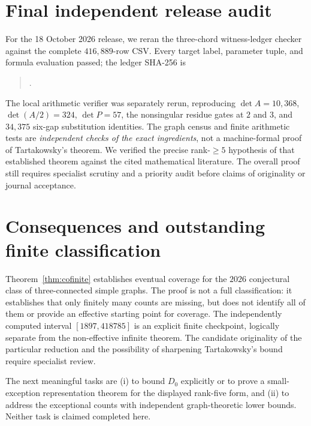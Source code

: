 \documentclass[9pt,a4paper,twocolumn]{extarticle}
\begin{document}
\section{Final independent release audit}
For the 18 October 2026 release, we reran the three-chord witness-ledger checker against the complete $416{,}889$-row CSV. Every target label, parameter tuple, and formula evaluation passed; the ledger SHA-256 is
\begin{quote}\ttfamily\footnotesize\raggedright
{}.
\end{quote}
The local arithmetic verifier was separately rerun, reproducing $\det A=10{,}368$, $\det(A/2)=324$, $\det P=57$, the nonsingular residue gates at $2$ and $3$, and $34{,}375$ six-gap substitution identities. The graph census and finite arithmetic tests are \emph{independent checks of the exact ingredients}, not a machine-formal proof of Tartakowsky's theorem. We verified the precise rank-$\geq5$ hypothesis of that established theorem against the cited mathematical literature. The overall proof still requires specialist scrutiny and a priority audit before claims of originality or journal acceptance.

\section{Consequences and outstanding finite classification}
Theorem~\ref{thm:cofinite} establishes eventual coverage for the $2026$ conjectural class of three-connected simple graphs. The proof is not a full classification: it establishes that only finitely many counts are missing, but does not identify all of them or provide an effective starting point for coverage. The independently computed interval $[1897,418785]$ is an explicit finite checkpoint, logically separate from the non-effective infinite theorem. The candidate originality of the particular reduction and the possibility of sharpening Tartakowsky's bound require specialist review.

The next meaningful tasks are (i) to bound $D_0$ explicitly or to prove a small-exception representation theorem for the displayed rank-five form, and (ii) to address the exceptional counts with independent graph-theoretic lower bounds. Neither task is claimed completed here.
\end{document}
